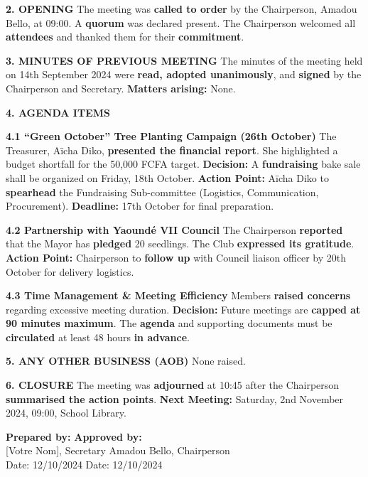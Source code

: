 \documentclass[11pt]{article}
\begin{document}
\begin{exoresolu}
\begin{textebox}
\textbf{2. OPENING}
The meeting was \textbf{called to order} by the Chairperson, Amadou Bello, at 09:00. A \textbf{quorum} was declared present. The Chairperson welcomed all \textbf{attendees} and thanked them for their \textbf{commitment}.

\textbf{3. MINUTES OF PREVIOUS MEETING}
The minutes of the meeting held on 14th September 2024 were \textbf{read, adopted unanimously}, and \textbf{signed} by the Chairperson and Secretary. \textbf{Matters arising:} None.

\textbf{4. AGENDA ITEMS}

\textbf{4.1 ``Green October'' Tree Planting Campaign (26th October)}
The Treasurer, Aïcha Diko, \textbf{presented the financial report}. She highlighted a budget shortfall for the 50,000 FCFA target. 
\textbf{Decision:} A \textbf{fundraising} bake sale shall be organized on Friday, 18th October. 
\textbf{Action Point:} Aïcha Diko to \textbf{spearhead} the Fundraising Sub-committee (Logistics, Communication, Procurement). \textbf{Deadline:} 17th October for final preparation.

\textbf{4.2 Partnership with Yaoundé VII Council}
The Chairperson \textbf{reported} that the Mayor has \textbf{pledged} 20 seedlings. The Club \textbf{expressed its gratitude}. 
\textbf{Action Point:} Chairperson to \textbf{follow up} with Council liaison officer by 20th October for delivery logistics.

\textbf{4.3 Time Management \& Meeting Efficiency}
Members \textbf{raised concerns} regarding excessive meeting duration. 
\textbf{Decision:} Future meetings are \textbf{capped at 90 minutes maximum}. The \textbf{agenda} and supporting documents must be \textbf{circulated} at least 48 hours \textbf{in advance}.

\textbf{5. ANY OTHER BUSINESS (AOB)}
None raised.

\textbf{6. CLOSURE}
The meeting was \textbf{adjourned} at 10:45 after the Chairperson \textbf{summarised the action points}. 
\textbf{Next Meeting:} Saturday, 2nd November 2024, 09:00, School Library.

\vspace{0.5cm}
\textbf{Prepared by:} \hrulefill \hspace{2cm} \textbf{Approved by:} \hrulefill \\
{}[Votre Nom], Secretary \hfill Amadou Bello, Chairperson \\
Date: 12/10/2024 \hfill Date: 12/10/2024
\end{textebox}


\end{exoresolu}
\end{document}
